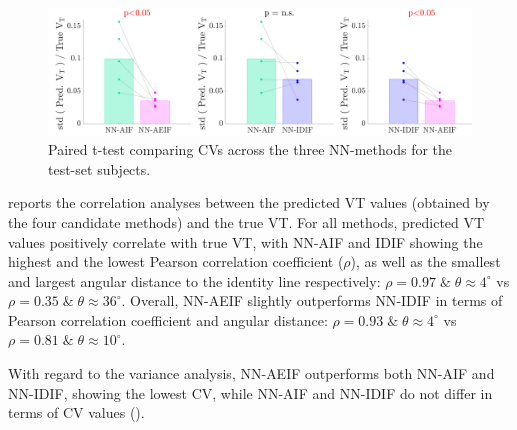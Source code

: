     \begin{figure}
        
        \centering
        
        \includegraphics[width=1.0\linewidth]{Figures/CVar.png}
        
        \vspace{-0.25cm}
        
        \captionsetup{singlelinecheck=false, justification=centering}
        \caption{
            \scriptsize
            Paired t-test comparing \glspl{CV} across the three \gls{NN}-methods for the test-set subjects. 
        }
        
        \label{fig:CVar}
        
        \vspace{-0.5cm}
   \end{figure}
   
    reports the correlation analyses between the predicted \gls{VT} values (obtained by the four candidate methods) and the true \gls{VT}. For all methods, predicted \gls{VT} values positively correlate with true \gls{VT}, with \gls{NN}-\gls{AIF} and \gls{IDIF} showing the highest and the lowest Pearson correlation coefficient ($\rho$), as well as the smallest and largest angular distance to the identity line respectively: $\rho = 0.97 \; \& \;  \theta \approx 4^{\circ}$ vs $\rho = 0.35 \; \&  \; \theta \approx 36^{\circ}$. Overall, \gls{NN}-\gls{AE}\gls{IF} slightly outperforms \gls{NN}-\gls{IDIF} in terms of Pearson correlation coefficient and angular distance: $\rho = 0.93 \; \& \; \theta  \approx 4^{\circ}$ vs $\rho = 0.81 \; \&  \; \theta \approx 10^{\circ}$.

    With regard to the variance analysis, \gls{NN}-\gls{AE}\gls{IF} outperforms both \gls{NN}-\gls{AIF} and \gls{NN}-\gls{IDIF}, showing the lowest \gls{CV}, while \gls{NN}-\gls{AIF} and \gls{NN}-\gls{IDIF} do not differ in terms of \gls{CV} values ().
